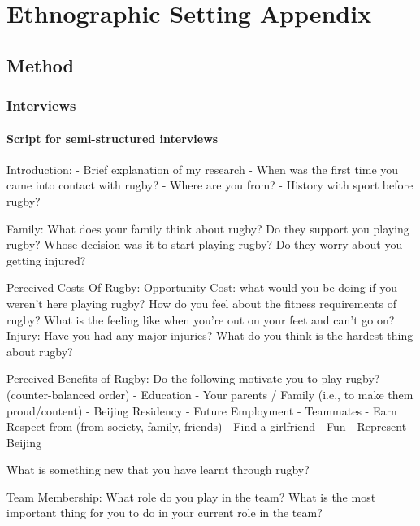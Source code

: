 
\chapter{\label{app4:ethnoSetting}Ethnographic Setting Appendix}

                                                \begin{CJK}{UTF8}{gbsn}


\section{Method\label{sect:methodChap4}}

  \subsection{Interviews}
    \subsubsection{Script for semi-structured interviews \label{sect:semiStructured}}


  Introduction:
  - Brief explanation of my research
  - When was the first time you came into contact with rugby?
  - Where are you from?
  - History with sport before rugby?

  Family:
  What does your family think about rugby?
  Do they support you playing rugby?
  Whose decision was it to start playing rugby?
  Do they worry about you getting injured?

  Perceived Costs Of Rugby:
  Opportunity Cost: what would you be doing if you weren’t here playing rugby?
  How do you feel about the fitness requirements of rugby?
  What is the feeling like when you’re out on your feet and can’t go on?
  Injury: Have you had any major injuries?
  What do you think is the hardest thing about rugby?

  Perceived Benefits of Rugby:
  Do the following motivate you to play rugby? (counter-balanced order)
  - Education
  - Your parents / Family (i.e., to make them proud/content)
  - Beijing Residency
  - Future Employment
  - Teammates
  - Earn Respect from (from society, family, friends)
  - Find a girlfriend
  - Fun
  - Represent Beijing

  What is something new that you have learnt through rugby?

  Team Membership:
  What role do you play in the team?
  What is the most important thing for you to do in your current role in the team?


\end{CJK}
